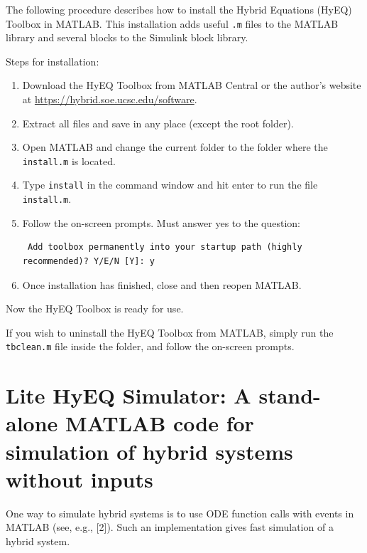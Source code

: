 \documentclass{article}
\newcommand{\HyEQfolder}{\mbox{{\ttfamily{ HyEQ\_Toolbox\_V2\_03\ }}}}
\begin{document}
The following procedure describes how to install the Hybrid Equations (HyEQ) Toolbox in MATLAB. This installation adds useful {\tt .m} files to the MATLAB library and several blocks to the Simulink block library.

Steps for installation:

\begin{enumerate}
\item Download the HyEQ Toolbox from MATLAB Central or the author's website at \url{https://hybrid.soe.ucsc.edu/software}.
\item Extract all files and save in any place (except the root folder).
\item Open MATLAB and change the current folder to the folder where the {\tt install.m} is located.
\item Type {\tt install} in the command window and hit enter to run the file {\tt install.m}.
\item Follow the on-screen prompts. Must answer yes to the question: \begin{verbatim} Add toolbox permanently into your startup path (highly recommended)? Y/E/N [Y]: y \end{verbatim}
\item Once installation has finished, close and then reopen MATLAB.
\end{enumerate}

Now the HyEQ Toolbox is ready for use.

If you wish to uninstall the HyEQ Toolbox from MATLAB, simply run the {\tt tbclean.m} file inside the \HyEQfolder folder, and follow the on-screen prompts.

\section{
Lite HyEQ Simulator: A stand-alone MATLAB code for simulation of  hybrid systems without inputs}
\label{sec:litesolver}
One way to simulate hybrid systems is to use ODE function calls with events in MATLAB (see, e.g., [2]). Such an implementation gives fast simulation of a hybrid system.
\end{document}
